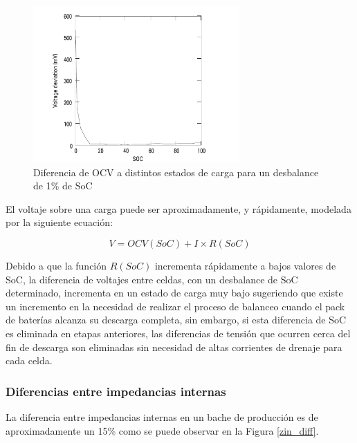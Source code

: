\documentclass[10pt,a4paper]{article}
\begin{document}
	\clearpage 
	
	\begin{figure}[h!]
		\begin{center}
			\includegraphics[width=0.7\textwidth]{diff_imbalance.png}
			\caption{Diferencia de OCV a distintos estados de carga para un desbalance de 1\% de SoC}
			\label{diff_imbalance}
		\end{center}
	\end{figure}
	
	\noindent El voltaje sobre una carga puede ser aproximadamente, 
    y rápidamente, modelada por la siguiente ecuación:
	
	\begin{equation}
		V = OCV(SoC) + I \times R(SoC)
		\label{v_load_bat}
	\end{equation}
	
	\noindent Debido a que la función $R(SoC)$ incrementa rápidamente a bajos 
    valores de SoC, la diferencia de voltajes entre celdas, con un desbalance 
    de SoC determinado, incrementa en un estado de carga muy bajo sugeriendo 
    que existe un incremento en la necesidad de realizar el proceso de balanceo 
    cuando el pack de baterías alcanza su descarga completa, sin embargo, 
    si esta diferencia de SoC es eliminada en etapas anteriores, las diferencias 
    de tensión que ocurren cerca del fin de descarga son eliminadas sin 
    necesidad de altas corrientes de drenaje para cada celda.
	
	\clearpage

	\subsubsection{Diferencias entre impedancias internas}
	
	La diferencia entre impedancias internas en un bache de producción es de 
    aproximadamente un 15\% como se puede observar en la Figura \ref{zin_diff}.
	
\end{document}
